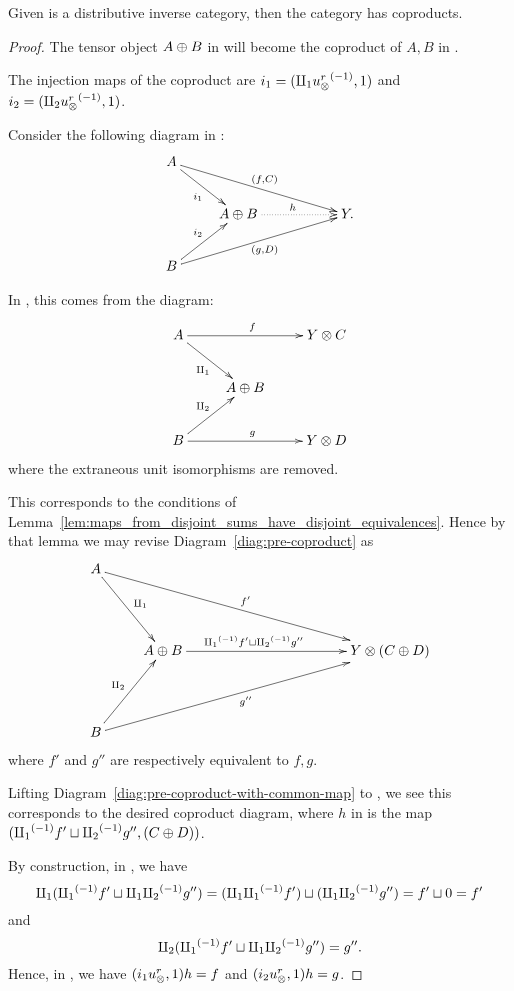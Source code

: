 \begin{theorem}\label{thm:x_tilde_has_coproducts_if_x_is_inverse_distributive_category}
  Given \X is a distributive inverse category, then the category \Xt has coproducts.
\end{theorem}
\begin{proof}
  The tensor object $A\oplus B$ in \X will become the coproduct of $A, B$ in \Xt.

  The injection maps of the coproduct are $i_1 =(\amalg_{1} {u_{\otimes}^r}^{(-1)}, 1)$ and
  $i_2 = (\amalg_{2} {u_{\otimes}^r}^{(-1)}, 1)$.

  Consider the following diagram in \Xt:
  \[
    \xymatrix{
      A \ar[drrr]^{(f,C)} \ar[dr]_{i_1} \\
      & A\+B \ar@{.>}[rr]^h & & Y. \\
      B \ar[urrr]_{(g,D)} \ar[ur]^{i_2}
    }
  \]

  In \X, this comes from the diagram:
  \begin{equation}
    \xymatrix{
      A \ar[dr]_{\cpa} \ar[rr]^f && Y\*C\\
      & A\+B\\
      B \ar[ur]^{\cpb} \ar[rr]^g && Y\*D\\
    }\label{diag:pre-coproduct}
  \end{equation}
  where the extraneous unit isomorphisms are removed.

  This corresponds to the conditions of
  Lemma~\ref{lem:maps_from_disjoint_sums_have_disjoint_equivalences}. Hence by that lemma we may
  revise Diagram~\ref{diag:pre-coproduct} as
  \begin{equation}
    \xymatrix@R+20pt {
      A \ar[dr]^{\cpa} \ar[drrrrr]^{f'}\\
      &A\+B \ar[rrrr]^(.4){\icpa f' \djoin \icpb g''} &&&& Y\*(C\+D)\\
      B \ar[ur]^{\cpb} \ar[urrrrr]_{g''}\\
    }\label{diag:pre-coproduct-with-common-map}
  \end{equation}
  where $f'$ and $g''$ are respectively equivalent to $f,g$.

  Lifting Diagram~\ref{diag:pre-coproduct-with-common-map} to \X, we see this corresponds to the
  desired coproduct diagram, where  $h$ in \Xt is the map $({\amalg_{1}}^{(-1)} f' \sqcup {\amalg_{2}}^{(-1)} g'', (C\oplus D))$.

  By construction, in \X, we have
  \[
    \amalg_{1} ({\amalg_{1}}^{(-1)} f' \sqcup \amalg_{1}{\amalg_{2}}^{(-1)} g'') = (\amalg_{1}{\amalg_{1}}^{(-1)} f') \sqcup (\amalg_{1}{\amalg_{2}}^{(-1)} g'') = f' \sqcup 0 = f'
  \]
  and
  \[
    \amalg_{2} ({\amalg_{1}}^{(-1)} f' \sqcup \amalg_{1}{\amalg_{2}}^{(-1)} g'') = g''.
  \]
  Hence, in \Xt, we have  $(i_1 u_{\otimes}^r, 1) h = f$ and $(i_2 u_{\otimes}^r, 1) h = g$.


\end{proof}
